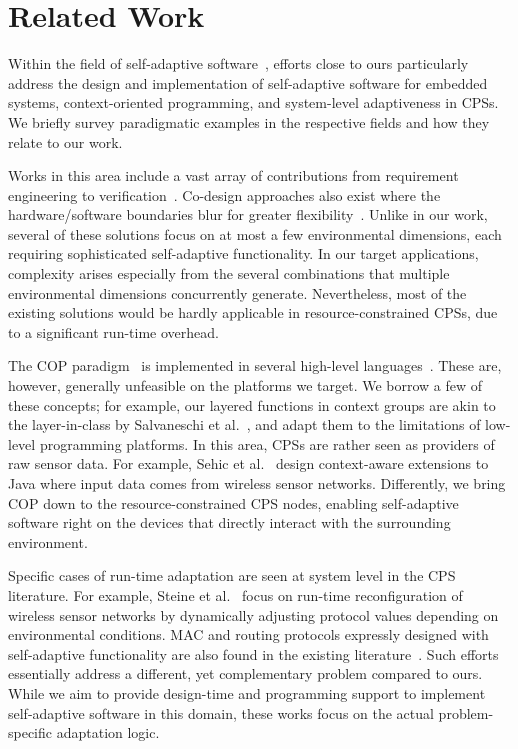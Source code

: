 \section{Related Work}
\label{sec:related}

Within the field of self-adaptive software~\cite{cheng:adaptive},
efforts close to ours particularly address the design and
implementation of self-adaptive software for embedded systems,
context-oriented programming, and system-level adaptiveness in
CPSs. We briefly survey paradigmatic examples in the respective fields
and how they relate to our work.

 Works in this area
include a vast array of contributions from requirement engineering to
verification~\cite{cheng:adaptive}. Co-design approaches also exist
where the hardware/software boundaries blur for greater
flexibility~\cite{diguet11:closed}. Unlike in our work, several of
these solutions focus on at most a few environmental dimensions, each
requiring sophisticated self-adaptive functionality. In our target
applications, complexity arises especially from the several
combinations that multiple environmental dimensions concurrently
generate. Nevertheless, most of the existing solutions would be hardly
applicable in resource-constrained CPSs, due to a significant
run-time overhead.

 The COP
paradigm~\cite{Hirschfeld08} is implemented in several high-level
languages~\cite{Kamina11,Ghezzi10,Bardram05,Sehic11,Salvaneschi12}. These
are, however, generally unfeasible on the platforms we target. We
borrow a few of these concepts; for example, our layered functions in
context groups are akin to the layer-in-class by Salvaneschi et
al.~\cite{Salvaneschi12}, and adapt them to the limitations of
low-level programming platforms. In this area, CPSs are rather seen as
providers of raw sensor data. For example, Sehic et al.~\cite{Sehic11}
design context-aware extensions to Java where input data comes from
wireless sensor networks. Differently, we bring COP down to the
resource-constrained CPS nodes, enabling self-adaptive software right
on the devices that directly interact with the surrounding
environment.

 Specific cases of run-time
adaptation are seen at system level in the CPS literature. For
example, Steine et al.~\cite{Steine11} focus on run-time
reconfiguration of wireless sensor networks by dynamically adjusting
protocol values depending on environmental conditions. MAC and routing
protocols expressly designed with self-adaptive functionality are also
found in the existing literature~\cite{Park08,Bourdenas11}. Such
efforts essentially address a different, yet complementary problem
compared to ours. While we aim to provide design-time and programming
support to implement self-adaptive software in this domain, these
works focus on the actual problem-specific adaptation logic.


